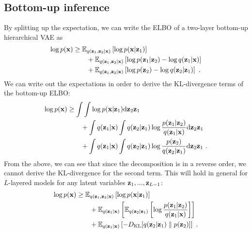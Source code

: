{\subsection{Bottom-up inference}
    By splitting up the expectation, we can write the ELBO of a two-layer bottom-up hierarchical VAE as
    \begin{align}
        \log p({\mathbf{x}}) &\ge \mathbb{E}_{q({\mathbf{z}}_1, {\mathbf{z}}_2|{\mathbf{x}})} \left[ \log p({\mathbf{x}}|{\mathbf{z}}_1) \right] \\
    &\qquad + \mathbb{E}_{q({\mathbf{z}}_1,{\mathbf{z}}_2|{\mathbf{x}})} \left[ \log p({\mathbf{z}}_1|{\mathbf{z}}_2) - \log q({\mathbf{z}}_1|{\mathbf{x}}) \right] \notag \\
    &\qquad + \mathbb{E}_{q({\mathbf{z}}_1,{\mathbf{z}}_2|{\mathbf{x}})} \left[ \log p({\mathbf{z}}_2) - \log q({\mathbf{z}}_2|{\mathbf{z}}_1) \right] \notag \ .
\end{align}
We can write out the expectations in order to derive the KL-divergence terms of the bottom-up ELBO:
\begin{align}
    \log p(\xb) &\ge \int \int \log p(\xb|\zb_1) \text{d}\zb_2\zb_1 \label{eq_hierarchical:2 layer VAE bottom up ELBO integrals} \\
    &\qquad + \int q(\zb_1|\xb) \int q(\zb_2|\zb_1) \log \frac{p(\zb_1|\zb_2)}{q(\zb_1|\xb)} \text{d}\zb_2\zb_1 \notag \\ 
    &\qquad + \int q(\zb_1|\xb) \int q(\zb_2|\zb_1) \log \frac{p(\zb_2)}{q(\zb_2|\zb_1)} \text{d}\zb_2\zb_1 \notag  \ .
\end{align}
From the above, we can see that since the decomposition is in a reverse order, we cannot derive the KL-divergence for the second term. This will hold in general for $L$-layered models for any latent variables  ${\mathbf{z}}_1,...,{\mathbf{z}}_{L-1}$:
\begin{align}
    \log p({\mathbf{x}}) &\ge \mathbb{E}_{q({\mathbf{z}}_1, {\mathbf{z}}_2|{\mathbf{x}})} \left[ \log p({\mathbf{x}}|{\mathbf{z}}_1) \right] \\
    &\qquad + \mathbb{E}_{q({\mathbf{z}}_1|{\mathbf{x}})}\left[ \mathbb{E}_{q({\mathbf{z}}_2|{\mathbf{z}}_1)}\left[\log \frac{p({\mathbf{z}}_1|{\mathbf{z}}_2)}{q({\mathbf{z}}_1|{\mathbf{x}})}\right]\right] \notag \\
    &\qquad + \mathbb{E}_{q({\mathbf{z}}_1|{\mathbf{x}})}\left[-D_\text{KL}[q({\mathbf{z}}_2|{\mathbf{z}}_1)\parallel p({\mathbf{z}}_2)]\right] \notag \ .
\end{align}


}
